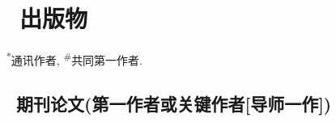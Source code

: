 \newcommand{\Revision}{\songtix{返修}}
\newcommand{\Review}{\songtix{审稿}}
\newcommand{\Submitted}{\songtix{投稿}}
\newcommand{\CS}{\textsuperscript{*}} %
\newcommand{\CF}{\textsuperscript{\#}} %


\section{\texorpdfstring{\faBook\ 出版物}{出版物}}
\CS 通讯作者, \CF 共同第一作者.

\subsection*{\texorpdfstring{\faBook\ 期刊论文(第一作者或关键作者[导师一作])}{期刊论文(第一作者或关键作者[导师一作])}}
